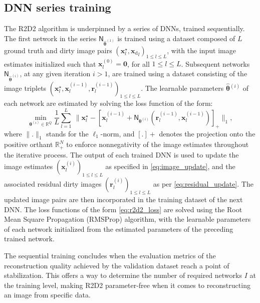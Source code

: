 \documentclass[preprint2,twocolumn]{aastex631}
\newcommand{\xb}{\ensuremath{\boldsymbol{x}}}
\newcommand{\rb}{\ensuremath{\boldsymbol{r}}}
\newcommand{\Nb}{\ensuremath{\boldsymbol{\mathsf{N}}}}
\newcommand{\thetab}{\ensuremath{\boldsymbol{\theta}}}
\newcommand{\eR}{\mathbb{R}}
\begin{document}
\subsection{DNN series training}\label{subsec:DNN-series-training}
The R2D2 algorithm is underpinned by a series of DNNs, trained sequentially. The first network in the series {$\Nb_{\widehat{\thetab}^{(1)}}$} is trained using a dataset composed of $L$
ground truth and dirty image pairs $(\xb_l^\star,{\xb_{\textrm{d}}}_l)_{1\leq l\leq L}$, with the input image estimates initialized such that ${\xb_l^{(0)}}=\bm{0}$, for all $ 1\leq l \leq L$. Subsequent networks $\Nb_{\widehat{\thetab}^{(i)}}$, at any given iteration $i >1$, are trained using a dataset consisting of the image triplets $(\xb_l^\star,{\xb_l^{(i-1)}},{\rb_l^{(i-1)}})_{1\leq l\leq L}$. 
The learnable parameters ${{\widehat{\thetab}}{^{(i)}}}$ of each network are estimated by solving the loss function of the form:
\begin{equation}
\label{eq:r2d2_loss}
 \min_{{\thetab}^{(i)}\in \eR^Q}\frac{1}{L} \sum_{l=1}^{L} ~ \| {\xb}^{\star}_{l} - [{\xb}^{(i-1)}_{l} + {{\Nb}}_{{\thetab}^{(i)}}(\rb_{l}^{(i-1)}, {\xb}^{(i-1)}_{l})]_{+} \|_{1},
\end{equation}
where $\lVert.\rVert_{1}$ stands for the $\ell_1$-norm, and $[.]{+}$ denotes the projection onto the positive orthant $\eR^N_+$ to enforce nonnegativity of the image estimates throughout the iterative process. The output of each trained DNN is used to update the image estimates $({\xb}^{(i)}_{l})_{1\leq l\leq L}$ as specified in \eqref{eq:image_update}, and the associated residual dirty images $({\rb}^{(i)}_{l})_{1\leq l\leq L}$ as per \eqref{eq:residual_update}. The updated image pairs are then incorporated in the training dataset of the next DNN. The loss functions of the form \eqref{eq:r2d2_loss} are solved using the Root Mean Square Propagation (RMSProp) algorithm, with the learnable parameters of each network initialized from the estimated parameters of the preceding trained network.

The sequential training concludes when the evaluation metrics of the reconstruction quality achieved by the validation dataset reach a point of stabilization. This offers a way to determine the number of required networks $I$ at the training level, making R2D2 parameter-free when it comes to reconstructing an image from specific data.

\end{document}

